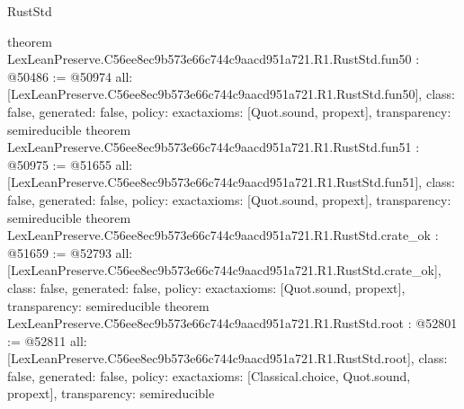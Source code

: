 \begin{lexlean}{RustStd}
\begin{coremodule}
{}
theorem LexLeanPreserve.C56ee8ec9b573e66c744c9aacd951a721.R1.RustStd.fun50 : @50486 := @50974 {
  all: [LexLeanPreserve.C56ee8ec9b573e66c744c9aacd951a721.R1.RustStd.fun50],
  class: false,
  generated: false,
  policy: exact{axioms: [Quot.sound, propext]},
  transparency: semireducible
}
theorem LexLeanPreserve.C56ee8ec9b573e66c744c9aacd951a721.R1.RustStd.fun51 : @50975 := @51655 {
  all: [LexLeanPreserve.C56ee8ec9b573e66c744c9aacd951a721.R1.RustStd.fun51],
  class: false,
  generated: false,
  policy: exact{axioms: [Quot.sound, propext]},
  transparency: semireducible
}
theorem LexLeanPreserve.C56ee8ec9b573e66c744c9aacd951a721.R1.RustStd.crate_ok : @51659 := @52793 {
  all: [LexLeanPreserve.C56ee8ec9b573e66c744c9aacd951a721.R1.RustStd.crate_ok],
  class: false,
  generated: false,
  policy: exact{axioms: [Quot.sound, propext]},
  transparency: semireducible
}
theorem LexLeanPreserve.C56ee8ec9b573e66c744c9aacd951a721.R1.RustStd.root : @52801 := @52811 {
  all: [LexLeanPreserve.C56ee8ec9b573e66c744c9aacd951a721.R1.RustStd.root],
  class: false,
  generated: false,
  policy: exact{axioms: [Classical.choice, Quot.sound, propext]},
  transparency: semireducible
}


\end{coremodule}
\end{lexlean}
